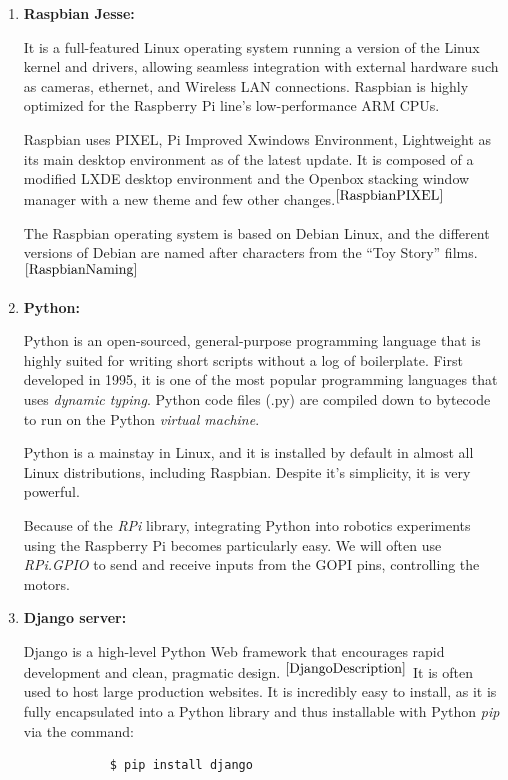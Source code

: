 	\begin{enumerate}[topsep=-2pt, itemsep=6mm]
		\item \textbf{Raspbian Jesse:} 
		
			It is a full-featured Linux operating system running a version of the Linux kernel and drivers, allowing seamless integration with external hardware such as cameras, ethernet, and Wireless LAN connections. Raspbian is highly optimized for the Raspberry Pi line's low-performance ARM CPUs.
			
			Raspbian uses PIXEL, Pi Improved Xwindows Environment, Lightweight as its main desktop environment as of the latest update. It is composed of a modified LXDE desktop environment and the Openbox stacking window manager with a new theme and few other changes.${}^{\cite{RaspbianPIXEL}}$ 
			
			The Raspbian operating system is based on Debian Linux, and the different versions of Debian are named after characters from the “Toy Story” films.${}^{\cite{RaspbianNaming}}$
		
		
		\item \textbf{Python:} 
		
		
		Python is an open-sourced, general-purpose programming language that is highly suited for writing short scripts without a log of boilerplate. First developed in 1995, it is one of the most popular programming languages that uses \textit{dynamic typing}. Python code files (.py) are compiled down to bytecode to run on the Python \textit{virtual machine}. 
		
		Python is a mainstay in Linux, and it is installed by default in almost all Linux distributions, including Raspbian. Despite it's simplicity, it is very powerful. 
		
		Because of the \textit{RPi} library, integrating Python into robotics experiments using the Raspberry Pi becomes particularly easy. We will often use \textit{RPi.GPIO} to send and receive inputs from the GOPI pins, controlling the motors. 
		
		
		\item \textbf{Django server:}
		
		Django is a high-level Python Web framework that encourages rapid development and clean, pragmatic design. ${}^{\cite{DjangoDescription}}$ It is often used to host large production websites. It is incredibly easy to install, as it is fully encapsulated into a Python library and thus installable with Python \textit{pip} via the command: 
		\begin{verbatim}  
			$ pip install django
		\end{verbatim}
		

\end{enumerate}
